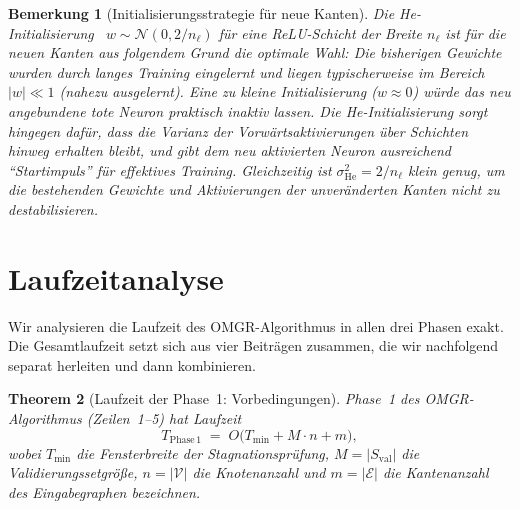 \documentclass[12pt, a4paper, openany]{report}
\newtheorem{theorem}{Theorem}[chapter]
\newtheorem{remark}[theorem]{Bemerkung}
\newcommand{\calN}{\mathcal{N}}
\newcommand{\calV}{\mathcal{V}}
\newcommand{\calE}{\mathcal{E}}
\begin{document}
\begin{remark}[Initialisierungsstrategie für neue Kanten]
\label{rem:he_init}
Die He-Initialisierung~\cite{he2015delving}
$w \sim \calN(0, 2/n_\ell)$ für eine ReLU-Schicht der Breite $n_\ell$
ist für die neuen Kanten aus folgendem Grund die optimale Wahl:
Die bisherigen Gewichte wurden durch langes Training eingelernt und liegen
typischerweise im Bereich $|w| \ll 1$ (nahezu ausgelernt).  Eine zu
kleine Initialisierung ($w \approx 0$) würde das neu angebundene tote
Neuron praktisch inaktiv lassen.  Die He-Initialisierung sorgt hingegen
dafür, dass die Varianz der Vorwärtsaktivierungen über Schichten hinweg
erhalten bleibt, und gibt dem neu aktivierten Neuron ausreichend
``Startimpuls'' für effektives Training.  Gleichzeitig ist
$\sigma_{\mathrm{He}}^2 = 2/n_\ell$ klein genug, um die bestehenden
Gewichte und Aktivierungen der unveränderten Kanten nicht zu destabilisieren.
\end{remark}

\section{Laufzeitanalyse}
\label{sec:algo_runtime}

Wir analysieren die Laufzeit des OMGR-Algorithmus in allen drei Phasen
exakt.  Die Gesamtlaufzeit setzt sich aus vier Beiträgen zusammen, die
wir nachfolgend separat herleiten und dann kombinieren.

\begin{theorem}[Laufzeit der Phase~1: Vorbedingungen]
\label{thm:runtime_phase1}
Phase~1 des OMGR-Algorithmus (Zeilen~1--5) hat Laufzeit
\begin{equation}
  \label{eq:runtime_phase1}
  T_{\mathrm{Phase\,1}} \;=\; O\!\bigl(T_{\min} + M \cdot n + m\bigr),
\end{equation}
wobei $T_{\min}$ die Fensterbreite der Stagnationsprüfung,
$M = |S_{\mathrm{val}}|$ die Validierungssetgröße,
$n = |\calV|$ die Knotenanzahl und
$m = |\calE|$ die Kantenanzahl des Eingabegraphen bezeichnen.
\end{theorem}
\end{document}

